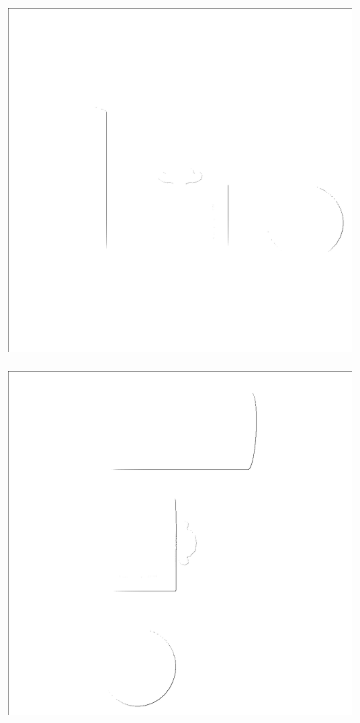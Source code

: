 \begin{figure}[H]
    \begin{subfigure}[t]{0.32\textwidth}
        \includegraphics[width=\linewidth]{chapter04/img/bearing-diag-0001.png}
    \end{subfigure}
    \begin{subfigure}[t]{0.32\textwidth}
        \includegraphics[width=\linewidth]{chapter04/img/bearing-diag-0030.png}

\end{subfigure}
\end{figure}
